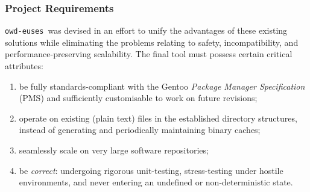 \documentclass{beamer}
\numberwithin{figure}{section}
\newcommand\programname{\texttt{owd-euses}}
\begin{document}
\begin{frame}
    \frametitle{Project Requirements}
    \programname\ was devised in an effort to unify the advantages of these
    existing solutions while eliminating the problems relating to safety,
    incompatibility, and performance-preserving scalability. The final tool must
    possess certain critical attributes:
    \pause

    \begin{enumerate}
        \item be fully standards-compliant with the Gentoo \emph{Package Manager
            Specification} (PMS) and sufficiently customisable to work on future
            revisions;
        \item operate on existing (plain text) files in the established
            directory structures, instead of generating and periodically
            maintaining binary caches;
        \item seamlessly scale on very large software repositories;
        \item be \emph{correct}: undergoing rigorous unit-testing,
            stress-testing under hostile environments, and never entering an
            undefined or non-deterministic state.
    \end{enumerate}
\end{frame}
\end{document}
